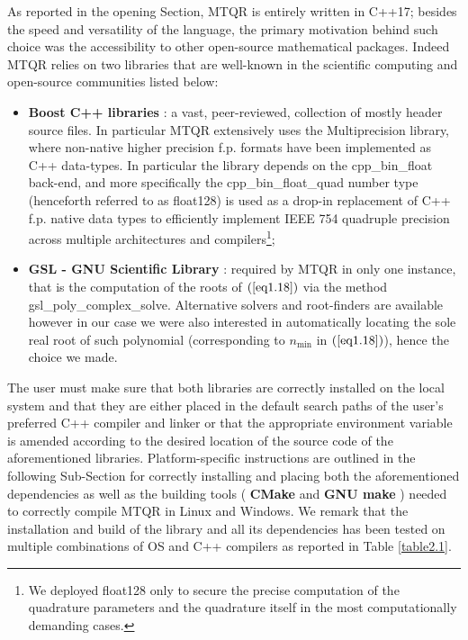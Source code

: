 \documentclass[a4paper, twosided]{book}
\begin{document}
\noindent
As reported in the opening Section, MTQR is entirely written in C++17; besides the speed and versatility of the language, the primary motivation behind such choice was the accessibility to other open-source mathematical packages. Indeed MTQR relies on two libraries that are well-known in the scientific computing and open-source communities listed below:

\begin{itemize}
    \item \color{poliDarkBlue} \textbf{Boost C++ libraries} \color{black}\cite{boost}: a vast, peer-reviewed, collection of mostly header source files. In particular MTQR extensively uses the \colorbox{poliGrayBlue}{Multiprecision} library, where non-native higher precision f.p. formats have been implemented as C++ data-types. In particular the library depends on the \colorbox{poliGrayBlue}{cpp\_bin\_float} back-end, and more specifically the \colorbox{poliGrayBlue}{cpp\_bin\_float\_quad} number type (henceforth referred to as \colorbox{poliGrayBlue}{float128}) is used as a drop-in replacement of C++ f.p. native data types to efficiently implement IEEE 754 quadruple precision across multiple architectures and compilers\footnote{We deployed \colorbox{poliGrayBlue}{float128} only to secure the precise computation of the quadrature parameters and the quadrature itself in the most computationally demanding cases.};
    
    \item \color{poliDarkBlue} \textbf{GSL - GNU Scientific Library} \color{black}\cite{gsl}: required by MTQR in only one instance, that is the computation of the roots of $(\ref{eq1.18})$ via the method \colorbox{poliGrayBlue}{gsl\_poly\_complex\_solve}. Alternative solvers and root-finders are available however in our case we were also interested in automatically locating the sole real root of such polynomial (corresponding to $n_{\text{min}}$ in $(\ref{eq1.18})$), hence the choice we made.
\end{itemize}

\noindent
The user must make sure that both libraries are correctly installed on the local system and that they are either placed in the default search paths of the user's preferred C++ compiler and linker or that the appropriate environment variable is amended according to the desired location of the source code of the aforementioned libraries. Platform-specific instructions are outlined in the following Sub-Section for correctly installing and placing both the aforementioned dependencies as well as the building tools (\color{poliDarkBlue} \textbf{CMake} \color{black} and \color{poliDarkBlue} \textbf{GNU make} \color{black}) needed to correctly compile MTQR in Linux and Windows. We remark that the installation and build of the library and all its dependencies has been tested on multiple combinations of OS and C++ compilers as reported in Table \ref{table2.1}.
\end{document}
